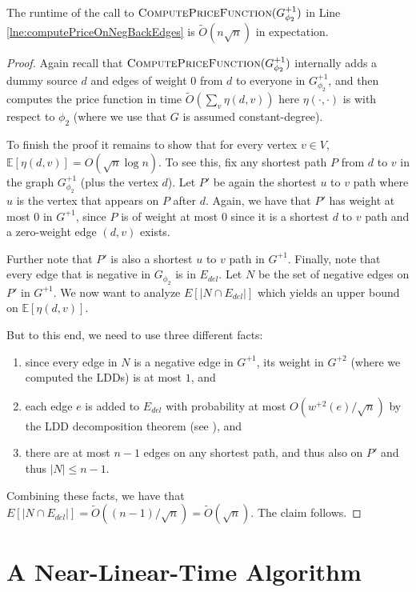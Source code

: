 \begin{claim}\label{clm:finalClaimNegSSSP}
The runtime of the call to $ \textsc{ComputePriceFunction}(G^{+1}_{\phi_2})$ in Line \ref{lne:computePriceOnNegBackEdges} is $\tilde{O}(n \sqrt{n})$ in expectation.
\end{claim}
\begin{proof}
Again recall that  $\textsc{ComputePriceFunction}(G^{+1}_{\phi_2})$ internally adds a dummy source $d$ and edges of weight $0$ from $d$ to everyone in $G^{+1}_{\phi_2}$, and then computes the price function in time $\tilde{O}(\sum_v \eta(d,v))$ here $\eta(\cdot, \cdot)$ is with respect to $\phi_2$ (where we use that $G$ is assumed constant-degree).

To finish the proof it remains to show that for every vertex $v \in V$, $\mathbb{E}[\eta(d,v)] = O( \sqrt{n} \log n)$. To see this, fix any shortest path $P$ from $d$ to $v$ in the graph $G^{+1}_{\phi_2}$ (plus the vertex $d$). Let $P'$ be again the shortest $u$ to $v$ path where $u$ is the vertex that appears on $P$ after $d$. Again, we have that $P'$ has weight at most $0$ in $G^{+1}$, since $P$ is of weight at most $0$ since it is a shortest $d$ to $v$ path and a zero-weight edge $(d,v)$ exists. 

Further note that $P'$ is also a shortest $u$ to $v$ path in $G^{+1}$. Finally, note that every edge that is negative in $G_{\phi_2}$ is in $E_{del}$. Let $N$ be the set of negative edges on $P'$ in $G^{+1}$. We now want to analyze $E[| N \cap E_{del}|]$ which yields an upper bound on  $\mathbb{E}[\eta(d,v)]$.

But to this end, we need to use three different facts:
\begin{enumerate}
    \item since every edge in $N$ is a negative edge in $G^{+1}$, its weight in $G^{+2}$ (where we computed the LDDs) is at most $1$, and 
    \item each edge $e$ is added to $E_{del}$ with probability at most $O(w^{+2}(e) / \sqrt{n})$ by the LDD decomposition theorem (see  ), and
    \item there are at most $n-1$ edges on any shortest path, and thus also on $P'$ and thus $|N| \leq n-1$.
\end{enumerate}
Combining these facts, we have that $E[| N \cap E_{del}|] = \tilde{O}((n-1) / \sqrt{n}) = \tilde{O}(\sqrt{n})$. The claim follows.
\end{proof}

\section{A Near-Linear-Time Algorithm}

